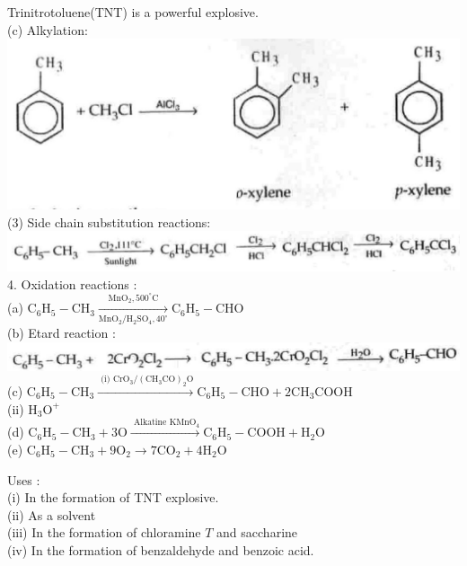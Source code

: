 \documentclass[10pt]{article}
\begin{document}
Trinitrotoluene(TNT) is a powerful explosive.\\
(c) Alkylation:\\
\includegraphics[max width=\textwidth, center]{2025_01_28_8470952b98110cec3aabg-215(1)}\\
(3) Side chain substitution reactions:\\
\includegraphics[max width=\textwidth, center]{2025_01_28_8470952b98110cec3aabg-215}\\
4. Oxidation reactions :\\
(a) $\mathrm{C}_{6} \mathrm{H}_{5}-\mathrm{CH}_{3} \xrightarrow[\mathrm{MnO}_{2} / \mathrm{H}_{2} \mathrm{SO}_{4}, 40^{\circ}]{\mathrm{MnO}_{2}, 500^{\circ} \mathrm{C}} \mathrm{C}_{6} \mathrm{H}_{5}-\mathrm{CHO}$\\
(b) Etard reaction :\\
\includegraphics[max width=\textwidth, center]{2025_01_28_8470952b98110cec3aabg-215(2)}\\
(c) $\mathrm{C}_{6} \mathrm{H}_{5}-\mathrm{CH}_{3} \xrightarrow{\text { (i) } \mathrm{CrO}_{3} /\left(\mathrm{CH}_{3} \mathrm{CO}\right)_{2} \mathrm{O}} \mathrm{C}_{6} \mathrm{H}_{5}-\mathrm{CHO}+2 \mathrm{CH}_{3} \mathrm{COOH}$\\
(ii) $\mathrm{H}_{3} \mathrm{O}^{+}$\\
(d) $\mathrm{C}_{6} \mathrm{H}_{5}-\mathrm{CH}_{3}+3 \mathrm{O} \xrightarrow{\text { Alkatine } \mathrm{KMnO}_{4}} \mathrm{C}_{6} \mathrm{H}_{5}-\mathrm{COOH}+\mathrm{H}_{2} \mathrm{O}$\\
(e) $\mathrm{C}_{6} \mathrm{H}_{5}-\mathrm{CH}_{3}+9 \mathrm{O}_{2} \rightarrow 7 \mathrm{CO}_{2}+4 \mathrm{H}_{2} \mathrm{O}$

Uses :\\
(i) In the formation of TNT explosive.\\
(ii) As a solvent\\
(iii) In the formation of chloramine $T$ and saccharine\\
(iv) In the formation of benzaldehyde and benzoic acid.
\end{document}
